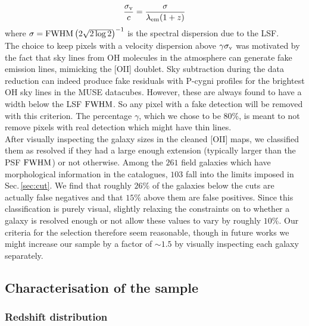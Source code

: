 \begin{equation}
	\frac{\sigma_{\rm{v}}}{c} = \frac{\sigma}{\lambda_{\rm{em}} (1+z)}
\end{equation}
where $\sigma = \rm{FWHM} \left (2 \sqrt{2 \log 2} \right )^{-1}$ is the spectral dispersion due to the LSF. \\

The choice to keep pixels with a velocity dispersion above $\gamma \sigma_{\rm{v}}$ was motivated by the fact that sky lines from OH molecules in the atmosphere can generate fake emission lines, mimicking the [OII] doublet. Sky subtraction during the data reduction can indeed produce fake residuals with P-cygni profiles for the brightest OH sky lines in the MUSE datacubes. However, these are always found to have a width below the LSF $\rm{FWHM}$. So any pixel with a fake detection will be removed with this criterion. The percentage $\gamma$, which we chose to be $80\%$, is meant to not remove pixels with real detection which might have thin lines.\\

After visually inspecting the galaxy sizes in the cleaned [OII] maps, we classified them as resolved if they had a large enough extension (typically larger than the PSF $\rm{FWHM}$) or not otherwise. Among the $261$ field galaxies which have morphological information in the catalogues, $103$ fall into the limits imposed in Sec.\,\ref{sec:cut}. We find that roughly $26\%$ of the galaxies below the cuts are actually false negatives and that $15\%$ above them are false positives. Since this classification is purely visual, slightly relaxing the constraints on to whether a galaxy is resolved enough or not allow these values to vary by roughly $10\%$. Our criteria for the selection therefore seem reasonable, though in future works we might increase our sample by a factor of $\sim 1.5$ by visually inspecting each galaxy separately.





\newpage
\subsection{Characterisation of the sample}
\label{sec:sample_characterisation}

\subsubsection{Redshift distribution}

